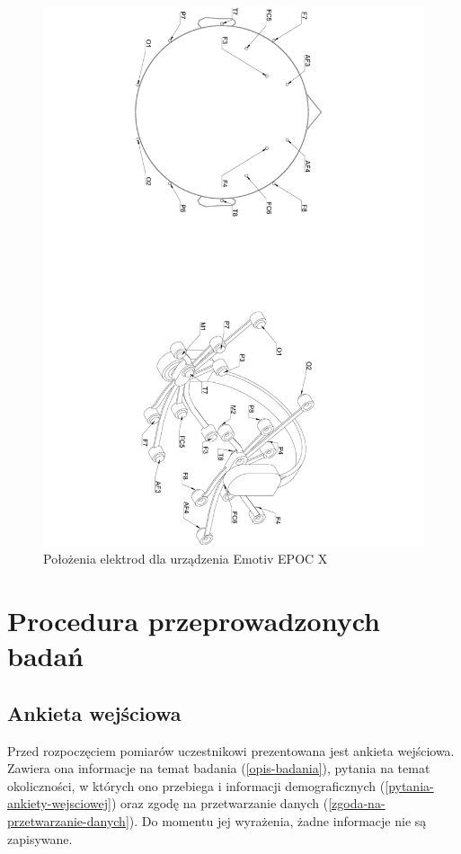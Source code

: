 \documentclass{./assets/wfis}
\begin{document}
\begin{figure}[h!]
    \centering
    \includegraphics[angle=90,trim={35cm 0 8cm 0},origin=c,width=\columnwidth]{./assets/yas6.pdf}
    \caption{Położenia elektrod dla urządzenia Emotiv EPOC X}
    \label{fig:emotiv-electrode-locations}
\end{figure}


\section{Procedura przeprowadzonych badań}\label{procedura-badan}
\subsection{Ankieta wejściowa}
Przed rozpoczęciem pomiarów uczestnikowi prezentowana jest ankieta wejściowa. Zawiera ona informacje na temat badania (\autoref{opis-badania}), pytania na temat okoliczności, w których ono przebiega i informacji demograficznych (\autoref{pytania-ankiety-wejsciowej}) oraz zgodę na przetwarzanie danych (\autoref{zgoda-na-przetwarzanie-danych}). Do momentu jej wyrażenia, żadne informacje nie są zapisywane.
\end{document}
